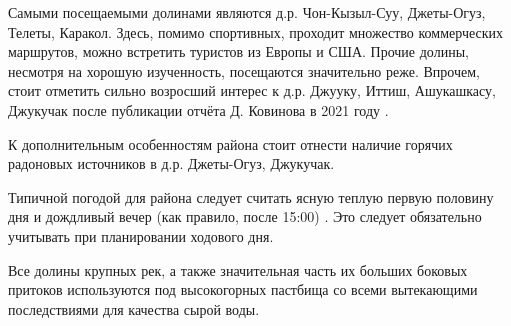 Самыми посещаемыми долинами являются д.р. Чон-Кызыл-Суу, Джеты-Огуз, Телеты, Каракол. Здесь, помимо спортивных, проходит множество коммерческих маршрутов, можно встретить туристов из Европы и США. Прочие долины, несмотря на хорошую изученность, посещаются значительно реже. Впрочем, стоит отметить сильно возросший интерес к д.р. Джууку, Иттиш, Ашукашкасу, Джукучак после публикации отчёта Д. Ковинова в 2021 году \cite{kovinov2021}.

К дополнительным особенностям района стоит отнести наличие горячих радоновых источников в д.р. Джеты-Огуз, Джукучак.

Типичной погодой для района следует считать ясную теплую первую половину дня и дождливый вечер (как правило, после 15:00) \cite{rodina2012, tipsina2024, sergeev2024, smurov2024}. Это следует обязательно учитывать при планировании ходового дня.

Все долины крупных рек, а также значительная часть их больших боковых притоков используются под высокогорных пастбища со всеми вытекающими последствиями для качества сырой воды.

\clearpage
